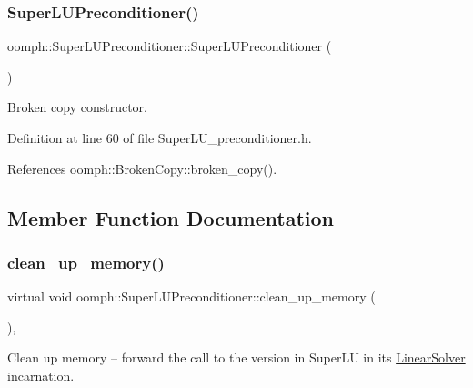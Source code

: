 \subsubsection{\texorpdfstring{Super\+L\+U\+Preconditioner()}{SuperLUPreconditioner()}\hspace{0.1cm}{\footnotesize\ttfamily [2/2]}}
{\footnotesize\ttfamily oomph\+::\+Super\+L\+U\+Preconditioner\+::\+Super\+L\+U\+Preconditioner (\begin{DoxyParamCaption}\item[{const \hyperlink{classoomph_1_1SuperLUPreconditioner}{Super\+L\+U\+Preconditioner} \&}]{ }\end{DoxyParamCaption})\hspace{0.3cm}{\ttfamily [inline]}}



Broken copy constructor. 



Definition at line 60 of file Super\+L\+U\+\_\+preconditioner.\+h.



References oomph\+::\+Broken\+Copy\+::broken\+\_\+copy().



\subsection{Member Function Documentation}
\mbox{\label{classoomph_1_1SuperLUPreconditioner_aa0a50217f8416c55af700cbedd750900}} 
\subsubsection{\texorpdfstring{clean\+\_\+up\+\_\+memory()}{clean\_up\_memory()}}
{\footnotesize\ttfamily virtual void oomph\+::\+Super\+L\+U\+Preconditioner\+::clean\+\_\+up\+\_\+memory (\begin{DoxyParamCaption}{ }\end{DoxyParamCaption})\hspace{0.3cm}{\ttfamily [inline]}, {\ttfamily [virtual]}}



Clean up memory -- forward the call to the version in Super\+LU in its \hyperlink{classoomph_1_1LinearSolver}{Linear\+Solver} incarnation. 



